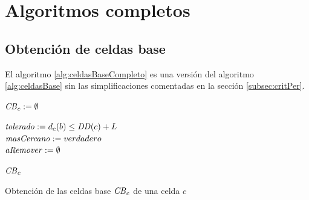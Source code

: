 \chapter{Algoritmos completos}

\section{Obtención de celdas base}\label{algComp:celdasbase}
El algoritmo \ref{alg:celdasBaseCompleto} es una versión del algoritmo \ref{alg:celdasBase} sin las
simplificaciones comentadas en la sección \ref{subsec:critPer}.

\begin{algorithm}[H]
\SetAlgoLined

  $\mathit{CB}_c := \emptyset$

   {
     {
      $\mathit{tolerado}  := d_c(b) \leq \mathit{DD}(c) + L$\\

      $\mathit{masCercano} := verdadero$\\
      $\mathit{aRemover} := \emptyset$\\
       {
      }
      
    }
  }
  \Return $\mathit{CB}_c$ 

  \caption{Obtención de las celdas base $\mathit{CB}_c$ de una celda $c$}
  \label{alg:celdasBaseCompleto}
\end{algorithm}

